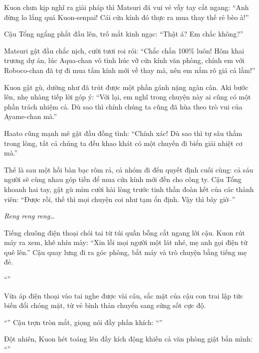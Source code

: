 \documentclass[../main.tex]{subfiles}
\begin{document}
Kuon chưa kịp nghĩ ra giải pháp thì Matsuri đã vui vẻ vẫy tay cắt ngang:
``Anh đừng lo lắng quá Kuon-senpai! Cái cửa kính đó thực ra mua thay thế rẻ bèo à!''

Cậu Tổng ngẩng phắt đầu lên, trố mắt kinh ngạc:
``Thật á? Em chắc không?''

Matsuri gật đầu chắc nịch, cười tươi roi rói:
``Chắc chắn 100\% luôn! Hôm khai trương dự án, lúc Aqua-chan vô tình húc vỡ cửa kính văn phòng, chính em với Roboco-chan đã tự đi mua tấm kính mới về thay mà, nên em nắm rõ giá cả lắm!''

Kuon gật gù, dường như đã trút được một phần gánh nặng ngàn cân. Aki bước lên, nhẹ nhàng tiếp lời góp ý:
``Với lại, em nghĩ trong chuyện này ai cũng có một phần trách nhiệm cả. Dù sao thì chính chúng ta cũng đã hùa theo trò vui của Ayame-chan mà.''

Haato cũng mạnh mẽ gật đầu đồng tình:
``Chính xác! Dù sao thì tự sâu thẳm trong lòng, tất cả chúng ta đều khao khát có một chuyến đi biển giải nhiệt cơ mà.''

Thế là sau một hồi bàn bạc rôm rả, cả nhóm đi đến quyết định cuối cùng: cả sáu người sẽ cùng nhau góp tiền để mua cửa kính mới đền cho công ty. Cậu Tổng khoanh hai tay, gật gù mỉm cười hài lòng trước tinh thần đoàn kết của các thành viên:
``Được rồi, thế thì mọi chuyện coi như tạm ổn định. Vậy thì bây giờ--''

\textit{Reng reng reng\dots}

Tiếng chuông điện thoại chói tai từ túi quần bỗng cắt ngang lời cậu. Kuon rút máy ra xem, khẽ nhíu mày:
``Xin lỗi mọi người một lát nhé, mẹ anh gọi điện từ quê lên.'' Cậu quay lưng đi ra góc phòng, bắt máy và trò chuyện bằng tiếng mẹ đẻ.

``''

Vừa áp điện thoại vào tai nghe được vài câu, sắc mặt của cậu con trai lập tức biến đổi chóng mặt, từ vẻ bình thản chuyển sang sửng sốt cực độ.

``'' Cậu trợn tròn mắt, giọng nói đầy phấn khích: ``''

Đột nhiên, Kuon hét toáng lên đầy kích động khiến cả văn phòng giật bắn mình:
``''
\end{document}
